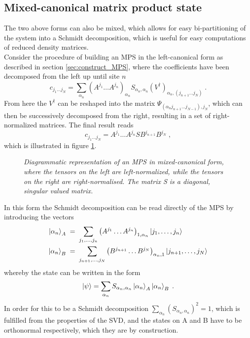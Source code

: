\subsection{Mixed-canonical matrix product state}
The two above forms can also be mixed, which allows for easy bi-partitioning of the system into a Schmidt decomposition, which is useful for easy computations of reduced density matrices.\\
Consider the procedure of building an MPS in the left-canonical form as described in section \ref{sec:construct_MPS}, where the coefficients have been decomposed from the left up until site $n$
\begin{equation}
	c_{j_1 \ldots j_N} = \sum_{\alpha_n} \left( A^{j_1} \ldots  A^{j_n} \right) _{\alpha_n} S_{\alpha_n , \alpha_n} (V^{\dag})_{\alpha_n , (j_{n+1} \ldots j_N)} \; .
\end{equation}
From here the $V^{\dag}$ can be reshaped into the matrix $\Psi_{(\alpha_n j_{n+1} \ldots j_{N-1}),j_N}$, which can then be successively decomposed from the right, resulting in a set of right-normalized matrices. The final result reads
\begin{equation}
	c_{j_1 \ldots j_N} = A^{j_1} \ldots A^{j_n} S B^{j_{n+1}} B^{j_N} \; ,
	\label{eq:mixedCanon}
\end{equation}
which is illustrated in figure \ref{fig:mixedCanon}.
\begin{figure}[h!]
	\centering
	
	\caption{\textit{Diagrammatic representation of an MPS in mixed-canonical form, where the tensors on the left are left-normalized, while the tensors on the right are right-normalised. The matrix S is a diagonal, singular valued matrix.}}
	\label{fig:mixedCanon}
\end{figure}
In this form the Schmidt decomposition can be read directly of the MPS by introducing the vectors
\begin{align}
 	\ket{\alpha_n}_A \; &= \; \sum_{j_1 , \ldots , j_n} \left( A^{j_1} \ldots A^{j_n} \right)_{1,\alpha_n} \ket{j_1 , \ldots , j_n}  \label{eq:mixedA} \\
 	\ket{\alpha_n}_B \; &= \; \sum_{j_{n+1} , \ldots , j_N} \left( B^{j_{n+1}} \ldots B^{j_N} \right)_{\alpha_n , 1} \ket{j_{n+1} , \ldots , j_N} \label{eq:mixedB}
\end{align}
whereby the state can be written in the form
\begin{equation}
	\ket{\psi} = \sum_{\alpha_n} S_{\alpha_n , \alpha_n} \ket{\alpha_n}_A \ket{\alpha_n}_B \; .
\end{equation}
In order for this to be a Schmidt decomposition $\sum_{\alpha_n} (S_{\alpha_n , \alpha_n})^2 = 1$, which is fulfilled from the properties of the SVD, and the states on A and B have to be orthonormal respectively, which they are by construction.

